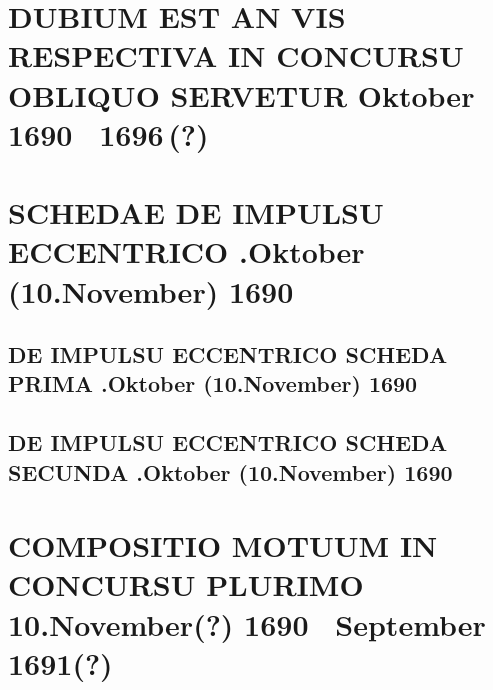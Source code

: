 \documentclass[%
fontsize=10pt,
]{scrbook}
\DeclareRobustCommand{\bracks}[1]{%
\textup{\lbrack}#1\textup{\rbrack}}
\begin{document}
\chapter[tocentry={Dubium est an vis respectiva in concursu obliquo servetur
\enskip \bracks{Oktober 1690 \textendash\ 1696\,(?)}},
head={Dubium est an vis respectiva in concursu obliquo servetur}]%
{\MakeUppercase{Dubium est an vis respectiva in concursu obliquo servetur}
\newline \bracks{Oktober 1690 \textendash\ 1696\,(?)}}
\label{58951}




\chapter[tocentry={Schedae de impulsu eccentrico
\enskip 31.\;Oktober (10.\;November) 1690},
head={Schedae de impulsu eccentrico}]%
{\MakeUppercase{Schedae de impulsu eccentrico}
.\;Oktober (10.\;November) 1690}
\label{sdie_intro}



\section[tocentry={De impulsu eccentrico scheda prima
\enskip 31.\;Oktober (10.\;November) 1690},
head={De impulsu eccentrico scheda prima}]%
{\MakeUppercase{De impulsu eccentrico scheda prima}
.\;Oktober (10.\;November) 1690}
\label{58940}



\section[tocentry={De impulsu eccentrico scheda secunda
\enskip 31.\;Oktober (10.\;November) 1690},
head={De impulsu eccentrico scheda secunda}]%
{\MakeUppercase{De impulsu eccentrico scheda secunda}
.\;Oktober (10.\;November) 1690}
\label{58939}




\chapter[tocentry={Compositio motuum in concursu plurimo
\enskip\bracks{%
10.\;November\;(?) 1690 \textendash\ September 1691\;(?)%
}},
head={Compositio motuum in concursu plurimo}]%
{\MakeUppercase{Compositio motuum in concursu plurimo}
\newline\bracks{%
10.\;November\;(?) 1690 \textendash\ September 1691\;(?)%
}}
\label{60295}

\end{document}

